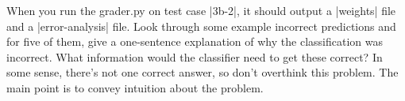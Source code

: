 \item {}

When you run the grader.py on test case |3b-2|, it should output a
|weights| file and a |error-analysis| file. Look through some example
incorrect predictions and for five of them, give a one-sentence explanation of
why the classification was incorrect. What information would the classifier
need to get these correct? In some sense, there's not one correct answer, so
don't overthink this problem. The main point is to convey intuition about the
problem.

